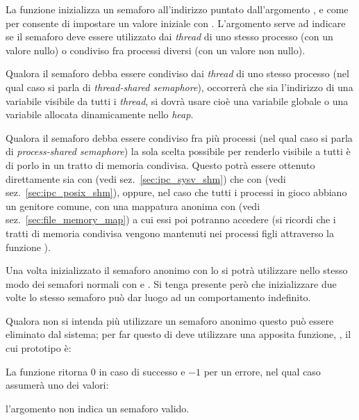 La funzione inizializza un semaforo all'indirizzo puntato dall'argomento
, e come per  consente di impostare un valore
iniziale con . L'argomento  serve ad indicare se
il semaforo deve essere utilizzato dai \textit{thread} di uno stesso processo
(con un valore nullo) o condiviso fra processi diversi (con un valore non
nullo).

Qualora il semaforo debba essere condiviso dai \textit{thread} di uno stesso
processo (nel qual caso si parla di \textit{thread-shared semaphore}),
occorrerà che  sia l'indirizzo di una variabile visibile da tutti i
\textit{thread}, si dovrà usare cioè una variabile globale o una variabile
allocata dinamicamente nello \textit{heap}.

Qualora il semaforo debba essere condiviso fra più processi (nel qual caso si
parla di \textit{process-shared semaphore}) la sola scelta possibile per
renderlo visibile a tutti è di porlo in un tratto di memoria condivisa. Questo
potrà essere ottenuto direttamente sia con  (vedi
sez.~\ref{sec:ipc_sysv_shm}) che con  (vedi
sez.~\ref{sec:ipc_posix_shm}), oppure, nel caso che tutti i processi in gioco
abbiano un genitore comune, con una mappatura anonima con  (vedi
sez.~\ref{sec:file_memory_map}) a cui essi poi potranno accedere (si ricordi
che i tratti di memoria condivisa vengono mantenuti nei processi figli
attraverso la funzione ).

Una volta inizializzato il semaforo anonimo con  lo si potrà
utilizzare nello stesso modo dei semafori normali con  e
. Si tenga presente però che inizializzare due volte lo stesso
semaforo può dar luogo ad un comportamento indefinito. 

Qualora non si intenda più utilizzare un semaforo anonimo questo può essere
eliminato dal sistema; per far questo di deve utilizzare una apposita
funzione, , il cui prototipo è:

\begin{funcproto}{
}
{La funzione ritorna $0$ in caso di successo e $-1$ per un errore, nel qual
  caso  assumerà uno dei valori:
  \begin{errlist}
    \item[\errcode{EINVAL}] l'argomento  non indica un semaforo
      valido.
  \end{errlist}
}  
\end{funcproto}

